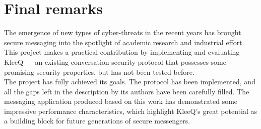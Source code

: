 \documentclass[a4paper, twoside, 12pt]{report}
\newcommand{\skippage}{\newpage\null\newpage}
\begin{document}
\section{Final remarks}
The emergence of new types of cyber-threats in the recent years has brought secure messaging into the spotlight of academic research and industrial effort. This project makes a practical contribution by implementing and evaluating KleeQ --- an existing conversation security protocol that possesses some promising security properties, but has not been tested before. \\

The project has fully achieved its goals. The protocol has been implemented, and all the gaps left in the description by its authors have been carefully filled. The messaging application produced based on this work has demonstrated some impressive performance characteristics, which highlight KleeQ's great potential as a building block for future generations of secure messengers.






\skippage
\end{document}
